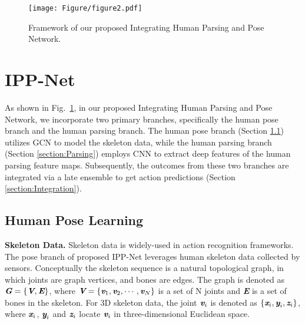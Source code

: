 \documentclass[runningheads]{llncs}
\begin{document}
\begin{figure}[t]
\texttt{[image: Figure/figure2.pdf]}
\caption{Framework of our proposed Integrating Human Parsing and Pose Network.} \label{network}
\end{figure}

\section{IPP-Net}
As shown in Fig.~\ref{network}, in our proposed Integrating Human Parsing and Pose Network, we incorporate two primary branches, specifically the human pose branch and the human parsing branch. The human pose branch (Section \ref{section:Pose}) utilizes GCN to model the skeleton data, while the human parsing branch (Section \ref{section:Parsing}) employs CNN to extract deep features of the human parsing feature maps. Subsequently, the outcomes from these two branches are integrated via a late ensemble to get action predictions (Section \ref{section:Integration}). 

\subsection{Human Pose Learning}
\label{section:Pose}
\textbf{Skeleton Data.} Skeleton data is widely-used in action recognition frameworks. The pose branch of proposed IPP-Net leverages human skeleton data collected by sensors. Conceptually the skeleton sequence is a natural topological graph, in which joints are graph vertices, and bones are edges. The graph is denoted as $\textit{\textbf{G}} = \left\{\textit{\textbf{V}}, \textit{\textbf{E}} \right\}$, where $\textit{\textbf{V}} = \left\{\textit{\textbf{v}}_{1}, \textit{\textbf{v}}_{2}, \cdots, \textit{\textbf{v}}_{N} \right\}$ is a set of N joints and \textit{\textbf{E}} is a set of bones in the skeleton. For 3D skeleton data, the joint $\textit{\textbf{v}}_{i}$ is denoted as $\left\{\textit{\textbf{x}}_{i}, \textit{\textbf{y}}_{i}, \textit{\textbf{z}}_{i} \right\}$, where $\textit{\textbf{x}}_{i}$, $\textit{\textbf{y}}_{i}$ and $\textit{\textbf{z}}_{i}$ locate $\textit{\textbf{v}}_{i}$ in three-dimensional Euclidean space.
\end{document}
